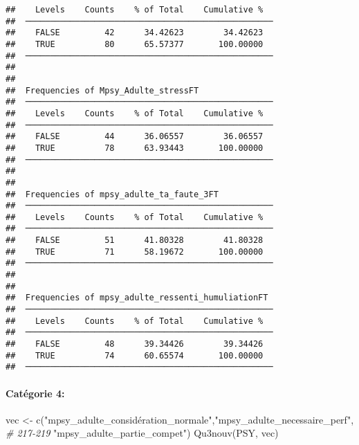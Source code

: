 \documentclass[
]{article}
\newenvironment{Shaded}{\begin{snugshade}}{\end{snugshade}}
\newcommand{\CommentTok}[1]{\textcolor[rgb]{0.56,0.35,0.01}{\textit{#1}}}
\newcommand{\FunctionTok}[1]{\textcolor[rgb]{0.00,0.00,0.00}{#1}}
\newcommand{\NormalTok}[1]{#1}
\newcommand{\OtherTok}[1]{\textcolor[rgb]{0.56,0.35,0.01}{#1}}
\newcommand{\StringTok}[1]{\textcolor[rgb]{0.31,0.60,0.02}{#1}}
\begin{document}
\begin{verbatim}
##    Levels    Counts    % of Total    Cumulative %   
##  ────────────────────────────────────────────────── 
##    FALSE         42      34.42623        34.42623   
##    TRUE          80      65.57377       100.00000   
##  ────────────────────────────────────────────────── 
## 
## 
##  Frequencies of Mpsy_Adulte_stressFT                
##  ────────────────────────────────────────────────── 
##    Levels    Counts    % of Total    Cumulative %   
##  ────────────────────────────────────────────────── 
##    FALSE         44      36.06557        36.06557   
##    TRUE          78      63.93443       100.00000   
##  ────────────────────────────────────────────────── 
## 
## 
##  Frequencies of mpsy_adulte_ta_faute_3FT            
##  ────────────────────────────────────────────────── 
##    Levels    Counts    % of Total    Cumulative %   
##  ────────────────────────────────────────────────── 
##    FALSE         51      41.80328        41.80328   
##    TRUE          71      58.19672       100.00000   
##  ────────────────────────────────────────────────── 
## 
## 
##  Frequencies of mpsy_adulte_ressenti_humuliationFT  
##  ────────────────────────────────────────────────── 
##    Levels    Counts    % of Total    Cumulative %   
##  ────────────────────────────────────────────────── 
##    FALSE         48      39.34426        39.34426   
##    TRUE          74      60.65574       100.00000   
##  ──────────────────────────────────────────────────
\end{verbatim}

\hypertarget{catuxe9gorie-4-1}{%
\paragraph{Catégorie 4:}\label{catuxe9gorie-4-1}}

\begin{Shaded}
\begin{Highlighting}[]
\NormalTok{vec }\OtherTok{\textless{}{-}} \FunctionTok{c}\NormalTok{(}\StringTok{"mpsy\_adulte\_considération\_normale"}\NormalTok{,}\StringTok{"mpsy\_adulte\_necessaire\_perf"}\NormalTok{,   }\CommentTok{\# 217{-}219}
         \StringTok{"mpsy\_adulte\_partie\_compet"}\NormalTok{) }
\FunctionTok{Qu3nouv}\NormalTok{(PSY, vec)}
\end{Highlighting}
\end{Shaded}
\end{document}
